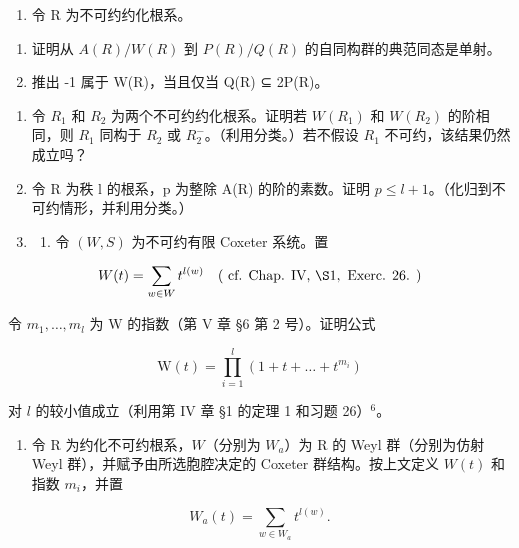 \begin{enumerate}
\def\labelenumi{\arabic{enumi})}
\setcounter{enumi}{6}
\tightlist
\item
  令 R 为不可约约化根系。
\end{enumerate}

\begin{enumerate}
\def\labelenumi{\alph{enumi})}
\item
  证明从 \(A(R)/W(R)\) 到 \(P(R)/Q(R)\) 的自同构群的典范同态是单射。
\item
  推出 -1 属于 W(R)，当且仅当 Q(R) ⊆ 2P(R)。
\end{enumerate}

\begin{enumerate}
\def\labelenumi{\arabic{enumi})}
\setcounter{enumi}{7}
\item
  令 \(R_{1}\) 和 \(R_{2}\) 为两个不可约约化根系。证明若 \(W(R_{1})\) 和 \(W(R_{2})\) 的阶相同，则 \(R_{1}\) 同构于 \(R_{2}\) 或 \(R_{2}^{-}\)。（利用分类。）若不假设 \(R_{1}\) 不可约，该结果仍然成立吗？
\item
  令 R 为秩 l 的根系，p 为整除 A(R) 的阶的素数。证明 \(p \leqslant l + 1\)。（化归到不可约情形，并利用分类。）
\item
  \begin{enumerate}
  \def\labelenumii{\alph{enumii})}
  \tightlist
  \item
    令 \((W, S)\) 为不可约有限 Coxeter 系统。置
  \end{enumerate}
\end{enumerate}

\[
W (t) = \sum_ {w \in W} t ^ {l (w)} \quad (\text { cf.   Chap.   IV,   } \S 1, \text {   Exerc.   26. })
\]

令 \(m_{1},\ldots ,m_{l}\) 为 W 的指数（第 V 章 §6 第 2 号）。证明公式

\[
\mathrm{W} (t) = \prod_ {i = 1} ^ {l} \left(1 + t + \dots + t ^ {m _ {i}}\right)
\]

对 \(l\) 的较小值成立（利用第 IV 章 §1 的定理 1 和习题 26）\(^{6}\)。

\begin{enumerate}
\def\labelenumi{\alph{enumi})}
\setcounter{enumi}{1}
\tightlist
\item
  令 R 为约化不可约根系，\(W\)（分别为 \(W_{a}\)）为 R 的 Weyl 群（分别为仿射 Weyl 群），并赋予由所选胞腔决定的 Coxeter 群结构。按上文定义 \(W(t)\) 和指数 \(m_{i}\)，并置
\end{enumerate}

\[
W _ {a} (t) = \sum_ {w \in W _ {a}} t ^ {l (w)}.
\]

